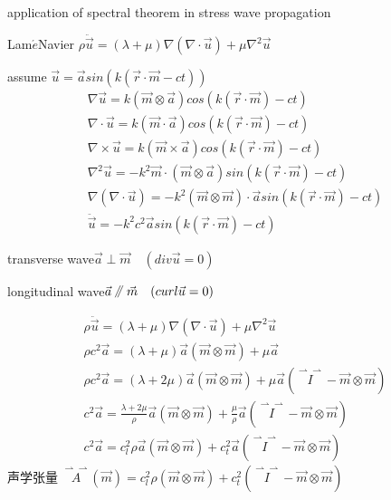 \documentclass[12pt, a4paper, oneside, UTF8]{ctexbook}  %
\newcommand{\vvec}{\overset{\rightharpoonup\!\!\!\! \rightharpoonup}}
\begin{document}
\begin{example}
    application of spectral theorem in stress wave propagation

    Lam$\acute{e}$\textminus Navier\quad
    $\rho\ddot{\vec{u}}=\left(\lambda+\mu\right)\nabla\left(\nabla\cdot\vec{u}\right)+\mu\nabla^2\vec{u}$

    assume \(\vec{u}=\vec{a}sin\left(k(\vec{r}\cdot\vec{m}-ct)\right)\)
    \begin{gather*}
        \nabla\vec{u}=k\left(\vec{m}\otimes\vec{a}\right)cos\left(k(\vec{r}\cdot\vec{m})-ct\right)\\
        \nabla\cdot\vec{u}=k\left(\vec{m}\cdot\vec{a}\right)cos\left(k(\vec{r}\cdot\vec{m})-ct\right)\\
        \nabla\times\vec{u}=k\left(\vec{m}\times\vec{a}\right)cos\left(k(\vec{r}\cdot\vec{m})-ct\right)\\
        \nabla^2\vec{u}=-k^2\vec{m}\cdot\left(\vec{m}\otimes\vec{a}\right)sin\left(k(\vec{r}\cdot\vec{m})-ct\right)\\
        \nabla(\nabla\cdot\vec{u})=-k^2\left(\vec{m}\otimes\vec{m}\right)\cdot\vec{a}sin\left(k(\vec{r}\cdot\vec{m})-ct\right)\\
        \ddot{\vec{u}}=-k^2c^2\vec{a}sin\left(k(\vec{r}\cdot\vec{m})-ct\right)
    \end{gather*}
    \begin{center}   
    transverse wave\(\vec{a}\perp\vec{m}\quad(div\vec{u}=0)\)

    longitudinal wave\(\vec{a}\zhparallel\vec{m}\quad(curl\vec{u}=0)\)
    \end{center}
    \begin{gather*}
        \rho\ddot{\vec{u}}=\left(\lambda+\mu\right)\nabla\left(\nabla\cdot\vec{u}\right)+\mu\nabla^2\vec{u}\\
        \rho c^2\vec{a}=\left(\lambda+\mu\right)\vec{a}\left(\vec{m}\otimes\vec{m}\right)+\mu\vec{a}\\
        \rho c^2\vec{a}=\left(\lambda+2\mu\right)\vec{a}\left(\vec{m}\otimes\vec{m}\right)
        +\mu\vec{a}\left(\vvec{I}-\vec{m}\otimes\vec{m}\right)\\
        c^2\vec{a}=\frac{\lambda+2\mu}{\rho}\vec{a}\left(\vec{m}\otimes\vec{m}\right)
        +\frac{\mu}{\rho}\vec{a}\left(\vvec{I}-\vec{m}\otimes\vec{m}\right)\\
        c^2\vec{a}=c_l^2{\rho}\vec{a}\left(\vec{m}\otimes\vec{m}\right)
        +c_t^2\vec{a}\left(\vvec{I}-\vec{m}\otimes\vec{m}\right)
    \end{gather*}
    声学张量 \(\vvec{A}(\vec{m})=c_l^2{\rho}\left(\vec{m}\otimes\vec{m}\right)
        +c_t^2\left(\vvec{I}-\vec{m}\otimes\vec{m}\right)\)
    \end{example}














\ifx\allfiles\undefined
\end{document}
